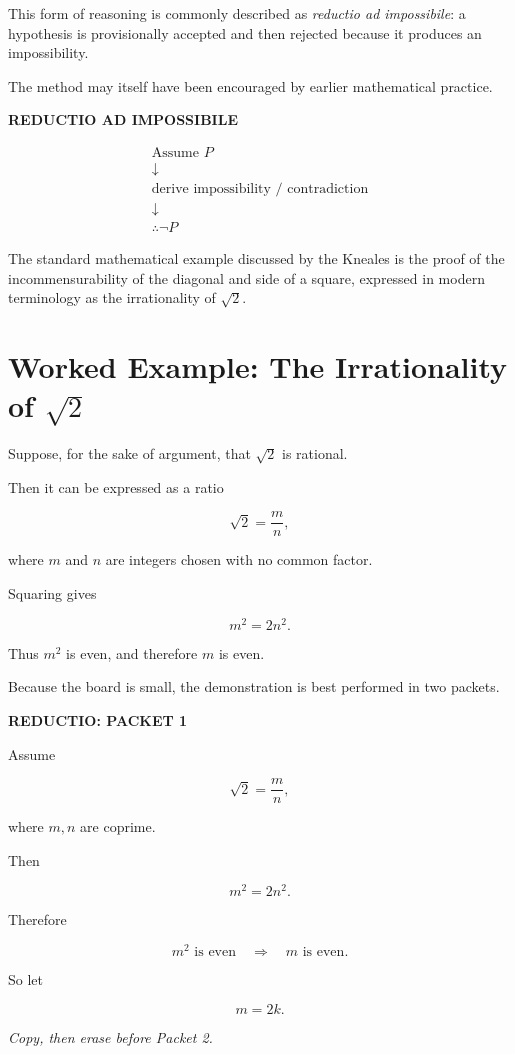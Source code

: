 \documentclass[11pt]{article}
\begin{document}
This form of reasoning is commonly described as
\textit{reductio ad impossibile}: a hypothesis is provisionally
accepted and then rejected because it produces an impossibility.

The method may itself have been encouraged by earlier
mathematical practice.

\begin{whiteboard}
\textbf{REDUCTIO AD IMPOSSIBILE}

\[
\begin{array}{c}
\text{Assume }P\\
\downarrow\\
\text{derive impossibility / contradiction}\\
\downarrow\\
\therefore \neg P
\end{array}
\]
\end{whiteboard}

The standard mathematical example discussed by the Kneales is
the proof of the incommensurability of the diagonal and side of a
square, expressed in modern terminology as the irrationality of
\(\sqrt{2}\).

\section{Worked Example: The Irrationality of \(\sqrt{2}\)}

Suppose, for the sake of argument, that \(\sqrt{2}\) is rational.

Then it can be expressed as a ratio

\[
\sqrt{2}=\frac{m}{n},
\]

where \(m\) and \(n\) are integers chosen with no common factor.

Squaring gives

\[
m^2=2n^2.
\]

Thus \(m^2\) is even, and therefore \(m\) is even.

Because the board is small, the demonstration is best performed
in two packets.

\begin{whiteboard}
\textbf{REDUCTIO: PACKET 1}

Assume

\[
\sqrt{2}=\frac{m}{n},
\]

where \(m,n\) are coprime.

Then

\[
m^2=2n^2.
\]

Therefore

\[
m^2\text{ is even}
\quad\Rightarrow\quad
m\text{ is even}.
\]

So let

\[
m=2k.
\]

\textit{Copy, then erase before Packet 2.}
\end{whiteboard}
\end{document}
